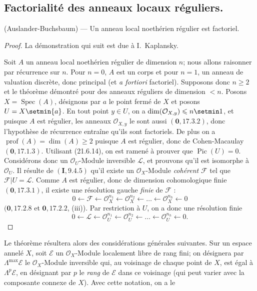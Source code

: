 \subsection{Factorialité des anneaux locaux réguliers.}
\label{IV.21.11}

\begin{theorem}[21.11.1]
\label{IV.21.11.1}
\textup{(Auslander-Buchsbaum)} ---
Un anneau local noethérien régulier est factoriel.
\end{theorem}

\begin{proof}
La démonstration qui suit est due à I.~Kaplansky.

Soit $A$ un anneau local noethérien régulier de dimension $n$; nous allons raisonner
par récurrence sur $n$. Pour $n=0$, $A$ est un corps et pour $n=1$, un anneau de
valuation discrète, donc principal (et \emph{a fortiori} factoriel). Supposons donc
$n\geq2$ et le théorème démontré pour des anneaux réguliers de dimension $<n$.
Posons $X=\operatorname{Spec}(A)$, désignons par $a$ le point fermé de $X$ et posons
$U=X\setmin\{a\}$. En tout point $y\in U$, on a
$\dim(\mathcal O_{X,y})\leq n\setmin 1$, et puisque $A$ est régulier, les anneaux
$\mathcal O_{X,y}$ le sont aussi $(\mathbf 0, 17.3.2)$, donc l'hypothèse de
récurrence entraîne qu'ils sont factoriels. De plus on a
$\operatorname{prof}(A)=\dim(A)\geq2$ puisque $A$ est régulier, donc de
Cohen-Macaulay $(\mathbf 0, 17.1.3)$.
Utilisant (21.6.14), on est ramené à prouver que $\operatorname{Pic}(U)=0$.
Considérons donc un $\mathcal O_U$-Module inversible $\mathscr L$, et prouvons qu'il
est isomorphe à $\mathcal O_U$. Il résulte de $(\mathbf I, 9.4.5)$ qu'il existe un
$\mathcal O_X$-Module \emph{cohérent} $\mathscr F$ tel que
$\mathscr F|U=\mathscr L$. Comme $A$ est régulier, donc de dimension cohomologique
finie $(\mathbf 0, 17.3.1)$, il existe une résolution gauche \emph{finie} de
$\mathscr F$ :
\[
  0\leftarrow\mathscr F\leftarrow\mathcal O_X^{n_1}
  \leftarrow\mathcal O_X^{n_2}\leftarrow\ldots
  \leftarrow\mathcal O_X^{n_h}\leftarrow0
\]
$(\mathbf 0, 17.2.8$ et $\mathbf 0, 17.2.2$, (iii)). Par restriction à $U$, on a
donc une résolution finie
\[
\label{IV.21.11.1.1}
  0\leftarrow\mathscr L\leftarrow\mathcal O_U^{n_1}
  \leftarrow\mathcal O_U^{n_2}\leftarrow\ldots
  \leftarrow\mathcal O_U^{n_h}\leftarrow0.
  \tag{21.11.1.1}
\]
\end{proof}

Le théorème résultera alors des considérations générales suivantes. Sur un espace
annelé $X$, soit $\mathscr E$ un $\mathcal O_X$-Module localement libre de rang fini;
on désignera par $\Lambda^{\max}\mathscr E$ le $\mathcal O_X$-Module inversible qui,
au voisinage de chaque point de $X$, est égal à $\Lambda^p\mathscr E$, en désignant
par $p$ le \emph{rang} de $\mathscr E$ dans ce voisinage (qui peut varier avec la composante
connexe de $X$). Avec cette notation, on a le

